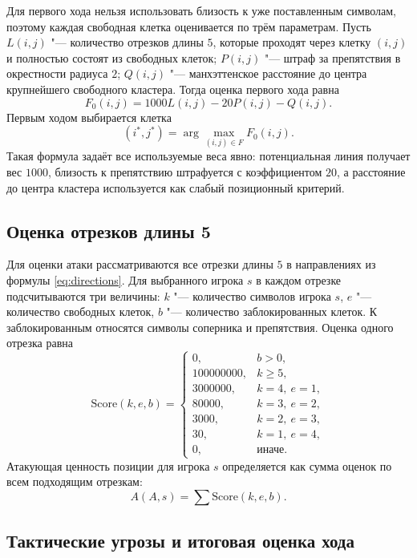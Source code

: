 \documentclass[a4paper,14pt]{extarticle}
\begin{document}
Для первого хода нельзя использовать близость к уже поставленным символам, поэтому каждая свободная клетка оценивается по трём параметрам. Пусть $L(i,j)$ "--- количество отрезков длины $5$, которые проходят через клетку $(i,j)$ и полностью состоят из свободных клеток; $P(i,j)$ "--- штраф за препятствия в окрестности радиуса $2$; $Q(i,j)$ "--- манхэттенское расстояние до центра крупнейшего свободного кластера. Тогда оценка первого хода равна
\begin{equation}
F_0(i,j)=1000L(i,j)-20P(i,j)-Q(i,j).
\label{eq:first_score}
\end{equation}
Первым ходом выбирается клетка
\begin{equation}
(i^*,j^*)=\arg\max_{(i,j)\in F} F_0(i,j).
\label{eq:first_argmax}
\end{equation}
Такая формула задаёт все используемые веса явно: потенциальная линия получает вес $1000$, близость к препятствию штрафуется с коэффициентом $20$, а расстояние до центра кластера используется как слабый позиционный критерий.

\subsection{Оценка отрезков длины 5}

Для оценки атаки рассматриваются все отрезки длины $5$ в направлениях из формулы \eqref{eq:directions}. Для выбранного игрока $s$ в каждом отрезке подсчитываются три величины: $k$ "--- количество символов игрока $s$, $e$ "--- количество свободных клеток, $b$ "--- количество заблокированных клеток. К заблокированным относятся символы соперника и препятствия. Оценка одного отрезка равна
\[
\mathrm{Score}(k,e,b)=
\begin{cases}
0, & b>0,\\
100000000, & k\geq 5,\\
3000000, & k=4,\ e=1,\\
80000, & k=3,\ e=2,\\
3000, & k=2,\ e=3,\\
30, & k=1,\ e=4,\\
0, & \text{иначе.}
\end{cases}
\]
Атакующая ценность позиции для игрока $s$ определяется как сумма оценок по всем подходящим отрезкам:
\[
A(A,s)=\sum \mathrm{Score}(k,e,b).
\]

\subsection{Тактические угрозы и итоговая оценка хода}
\end{document}
